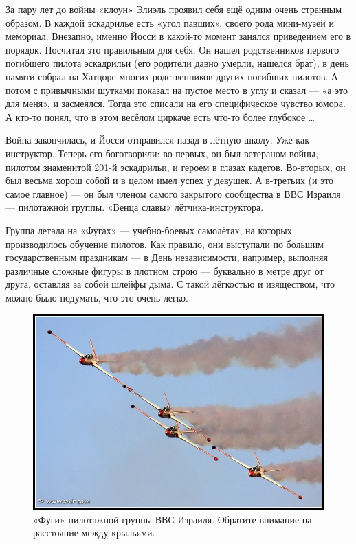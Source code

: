 За пару лет до войны «клоун» Элиэль проявил себя ещё одним очень странным образом. В каждой эскадрилье есть «угол павших», своего рода мини-музей и мемориал. Внезапно, именно Йосси в какой-то момент занялся приведением его в порядок. Посчитал это правильным для себя. Он нашел родственников первого погибшего пилота эскадрильи (его родители давно умерли, нашелся брат), в день памяти собрал на Хатцоре многих родственников других погибших пилотов. А потом с привычными шутками показал на пустое место в углу и сказал — «а это для меня», и засмеялся. Тогда это списали на его специфическое чувство юмора. А кто-то понял, что в этом весёлом циркаче есть что-то более глубокое …

Война закончилась, и Йосси отправился назад в лётную школу. Уже как инструктор. Теперь его боготворили: во-первых, он был ветераном войны, пилотом знаменитой 201-й эскадрильи, и героем в глазах кадетов. Во-вторых, он был весьма хорош собой и в целом имел успех у девушек. А в-третьих (и это самое главное) — он был членом самого закрытого сообщества в ВВС Израиля — пилотажной группы. «Венца славы» лётчика-инструктора.

Группа летала на «Фугах» — учебно-боевых самолётах, на которых производилось обучение пилотов. Как правило, они выступали по большим государственным праздникам — в День независимости, например, выполняя различные сложные фигуры в плотном строю — буквально в метре друг от друга, оставляя за собой шлейфы дыма. С такой лёгкостью и изяществом, что можно было подумать, что это очень легко.

\begin{figure}[h!tb] 
	\centering\includegraphics[scale=0.5]{History_Yosya/MiOSXvxzAsk.jpg}
	\caption{«Фуги» пилотажной группы ВВС Израиля. Обратите внимание на расстояние между крыльями.}%
\end{figure}

